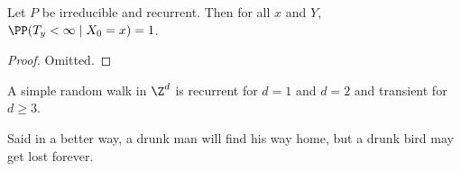 \documentclass[a4paper]{scrartcl}
\begin{document}
\begin{theorem}
	Let $P$ be irreducible and recurrent. Then for all $x$ and $Y$, $\PP(T_y < \infty \mid X_0 = x) = 1$.
\end{theorem}
\begin{proof}
	Omitted.
\end{proof}

\begin{theorem}[Pólya]
	A simple random walk in $\Z^d$ is recurrent for $d = 1$ and $d = 2$ and transient for $d \geq 3$.
\end{theorem}

Said in a better way, a drunk man will find his way home, but a drunk bird may get lost forever.
\end{document}
